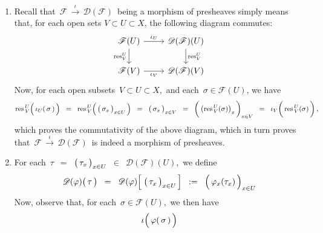 \proof
\begin{enumerate}
\item
	Recall that 
	\,$\mathscr{F}\,\overset{\iota}{\longrightarrow}\,\mathscr{D}(\mathscr{F})$\,
	being a morphism of presheaves simply means that,
	for each open sets $V \subset U \subset X$, the following diagram commutes:
	\begin{equation*}
	\begin{tikzcd}
	\mathscr{F}(U)  \arrow[r, "\iota_{U}"] \arrow[d, "\res^{U}_{V}"'] & \mathscr{D}(\mathscr{F})(U) \arrow[d, "\res^{U}_{V}"] \\
	\mathscr{F}(V) \arrow[r, "\iota_{V}"'] & \mathscr{D}(\mathscr{F})(V)
	\end{tikzcd}
	\end{equation*}
	Now, for each open subsets \,$V \subset U \subset X$,\, and each \,$\sigma \in \mathscr{F}(U)$,
	we have
	\begin{equation*}
	\res^{\,U}_{\,V}\!\left(\,\overset{{\color{white}.}}{\iota_{U}(\,\sigma\,)}\,\right)
	\;\; = \;\;
		\res^{\,U}_{\,V}\!\left(\,
			\left(\,\overset{{\color{white}.}}{\sigma_{x}}\,\right)_{x \in U}
			\,\right)
	\;\; = \;\;
		\left(\,\overset{{\color{white}.}}{\sigma_{x}}\,\right)_{x \in V}
	\;\; = \;\;
		\left(\,\overset{{\color{white}.}}{\left(\res^{\,U}_{\,V}(\sigma)\right)_{x}}\,\right)_{x \in V}
	\;\; = \;\;
		\iota_{V}\!\left(\,\overset{{\color{white}.}}{\res^{\,U}_{\,V}(\sigma)}\,\right),
	\end{equation*}
	which proves the commutativity of the above diagram, which in turn proves that
	\,$\mathscr{F}\,\overset{\iota}{\longrightarrow}\,\mathscr{D}(\mathscr{F})$\,
	is indeed a morphism of presheaves.
\item
	For each
	\,$\tau$
	\,$=$\, $\left(\,\overset{{\color{white}.}}{\tau_{x}}\,\right)_{x \in U}$
	\,$\in$\, $\mathscr{D}(\mathscr{F})(U)$,\,
	we define
	\begin{equation*}
	\mathscr{D}(\varphi)\!\left(\,\overset{{\color{white}.}}{\tau}\,\right)
	\;\; = \;\;
		\mathscr{D}(\varphi)\!\left[\;\left(\,\overset{{\color{white}.}}{\tau_{x}}\,\right)_{x \in U}\,\right]
	\;\; := \;\;
		\left(\,\overset{{\color{white}.}}{\varphi_{x}(\tau_{x})}\,\right)_{x \in U}
	\end{equation*}
	Now, observe that, for each \,$\sigma \in \mathscr{F}(U)$,\, we then have
	\begin{equation*}
	\iota\!\left(\,\overset{{\color{white}.}}{\varphi(\,\sigma\,)}\,\right)

\end{equation*}
\end{enumerate}
